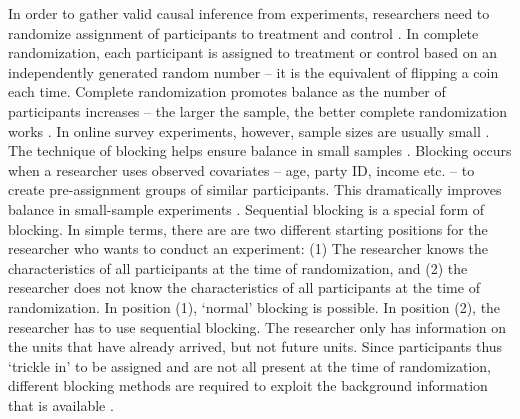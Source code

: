 \documentclass[11pt]{article}
\begin{document}
In order to gather valid causal inference from experiments, researchers need to randomize assignment of participants to treatment and control \citep{king_a-politically_2007,imai_2009_essential}. In complete randomization, each participant is assigned to treatment or control based on an independently generated random number \citep{lachin_1988_properties,king_designing_1994} -- it is the equivalent of flipping a coin each time. Complete randomization promotes balance as the number of participants increases -- the larger the sample, the better complete randomization works \citep{moore_2012_multivariate,fox_applied_2015}. In online survey experiments, however, sample sizes are usually small \citep{imai_2008_misunderstandings}. The technique of blocking helps ensure balance in small samples \citep{moore_blocking_2013}. Blocking occurs when a researcher uses observed covariates -- age, party ID, income etc. -- to create pre-assignment groups of similar participants. This dramatically improves balance in small-sample experiments \citep{epstein_2002_rules}. Sequential blocking is a special form of blocking. In simple terms, there are are two different starting positions for the researcher who wants to conduct an experiment: (1) The researcher knows the characteristics of all participants at the time of randomization, and (2) the researcher does not know the characteristics of all participants at the time of randomization. In position (1), `normal' blocking is possible. In position (2), the researcher has to use sequential blocking.  The researcher only has information on the units that have already arrived, but not future units. Since participants thus `trickle in' to be assigned and are not all present at the time of randomization, different blocking methods are required to exploit the background information that is available \citep{urdan_statistics_2010,boas_fielding_2013,imai_quantitative_2018}.

\vspace{0.3cm}
\end{document}
